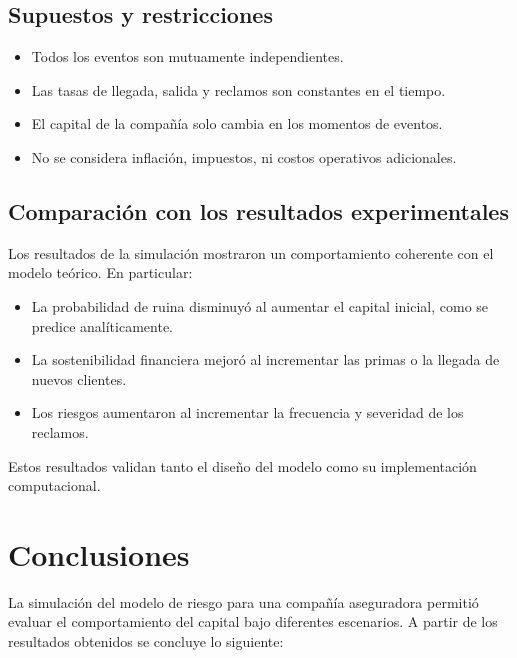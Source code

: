 \documentclass{article}
\begin{document}
\subsection{Supuestos y restricciones}
\begin{itemize}
\item Todos los eventos son mutuamente independientes.
\item Las tasas de llegada, salida y reclamos son constantes en el tiempo.
\item El capital de la compañía solo cambia en los momentos de eventos.
\item No se considera inflación, impuestos, ni costos operativos adicionales.
\end{itemize}

\subsection{Comparación con los resultados experimentales}
Los resultados de la simulación mostraron un comportamiento coherente con el modelo teórico. En particular:

\begin{itemize}
\item La probabilidad de ruina disminuyó al aumentar el capital inicial, como se predice analíticamente.
\item La sostenibilidad financiera mejoró al incrementar las primas o la llegada de nuevos clientes.
\item Los riesgos aumentaron al incrementar la frecuencia y severidad de los reclamos.
\end{itemize}

Estos resultados validan tanto el diseño del modelo como su implementación computacional.

\section{Conclusiones}

La simulación del modelo de riesgo para una compañía aseguradora permitió evaluar el comportamiento del capital bajo diferentes escenarios. A partir de los resultados obtenidos se concluye lo siguiente:
\end{document}
